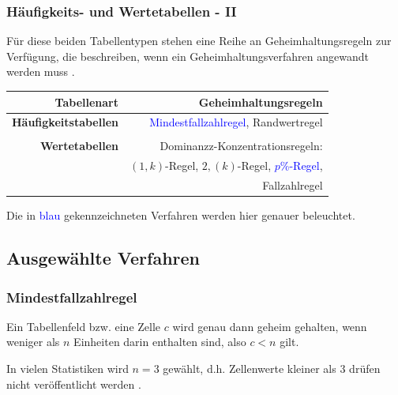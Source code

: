 \documentclass[aspectratio=169]{beamer}
\begin{document}
\begin{frame}
    \frametitle{Häufigkeits- und Wertetabellen - II}
    Für diese beiden Tabellentypen stehen eine Reihe an Geheimhaltungsregeln zur Verfügung, die beschreiben, wenn ein Geheimhaltungsverfahren angewandt werden muss \cite{Nickl}.
    \begin{center}
        \begin{tabular}{ r r }
         \textbf{Tabellenart} \vline & \textbf{Geheimhaltungsregeln} \\ 
         \hline
         \textbf{Häufigkeitstabellen} \vline & \textcolor{blue}{Mindestfallzahlregel}, Randwertregel \\  
         \vline & \\
         \hline
         \textbf{Wertetabellen} \vline & Dominanzz-Konzentrationsregeln:  \\
         \vline & $(1,k)$-Regel, $2,(k)$-Regel, \textcolor{blue}{$p$\%-Regel}, \\
         \vline & Fallzahlregel
        \end{tabular}
    \end{center}
    Die in \textcolor{blue}{blau} gekennzeichneten Verfahren werden hier genauer beleuchtet.
\end{frame}


\subsection{Ausgewählte Verfahren}

\begin{frame}
    \frametitle{Mindestfallzahlregel}
    \begin{theorem}[Mindestfallzahlregel]
        Ein Tabellenfeld bzw. eine Zelle $c$ wird genau dann geheim gehalten, wenn weniger als $n$ Einheiten darin enthalten sind, also $c < n$ gilt.
    \end{theorem}
    In vielen Statistiken wird $n = 3$ gewählt, d.h. Zellenwerte kleiner als $3$ drüfen nicht veröffentlicht werden \cite{Nickl}.
\end{frame}
\end{document}
